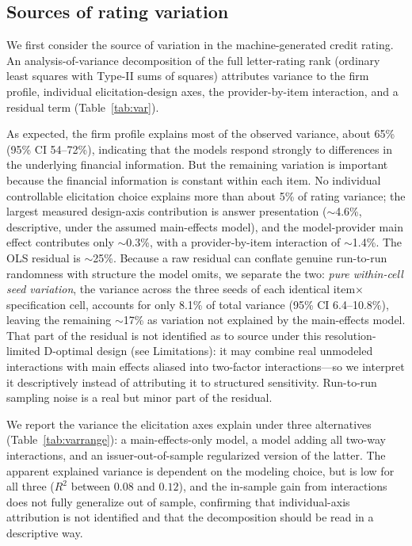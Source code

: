 \documentclass[a4paper,fleqn]{cas-sc}
\begin{document}
\subsection{Sources of rating variation}
We first consider the source of variation in the machine-generated credit rating. An
analysis-of-variance decomposition of the full letter-rating rank (ordinary least squares with Type-II
sums of squares) attributes variance to the firm profile, individual elicitation-design axes, the
provider-by-item interaction, and a residual term (Table~\ref{tab:var}).

As expected, the firm profile explains most of the observed variance, about 65\% (95\% CI 54--72\%),
indicating that the models respond strongly to differences in the underlying financial information. But
the remaining variation is important because the financial information is constant within each item. No
individual controllable elicitation choice explains more than about 5\% of rating variance; the largest
measured design-axis contribution is answer presentation ($\sim$4.6\%, descriptive, under the assumed
main-effects model), and the model-provider main effect contributes only $\sim$0.3\%, with a
provider-by-item interaction of $\sim$1.4\%. The OLS residual
is $\sim$25\%. Because a raw residual can conflate genuine run-to-run randomness with structure the model
omits, we separate the two: \emph{pure within-cell seed variation}, the variance across the three seeds
of each identical item$\times$specification cell, accounts for only 8.1\% of total variance (95\% CI
6.4--10.8\%), leaving the remaining $\sim$17\% as variation not explained by the main-effects model.
That part of the residual is not identified as to source under this resolution-limited D-optimal design
(see Limitations): it may combine real unmodeled interactions with main effects aliased into two-factor
interactions---so we interpret it descriptively instead of attributing it to structured sensitivity.
Run-to-run sampling noise is a real but minor part of the residual.

We report the variance the
elicitation axes explain under three alternatives (Table~\ref{tab:varrange}): a main-effects-only model,
a model adding all two-way interactions, and an issuer-out-of-sample regularized version of the latter.
The apparent explained variance is dependent on the modeling choice, but is low for all three
($R^2$ between $0.08$ and $0.12$), and the in-sample gain from interactions does not fully generalize out
of sample, confirming that individual-axis attribution is not identified and that the decomposition should
be read in a descriptive way.
\end{document}
